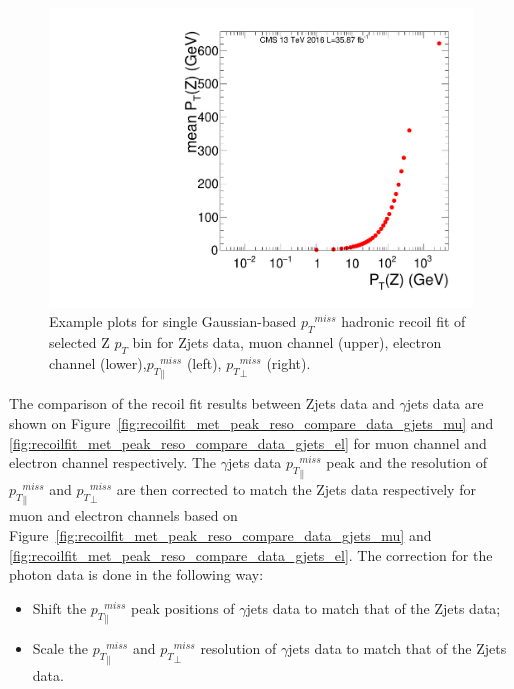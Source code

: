 \begin{figure}[htbp]
\begin{center}
\includegraphics[width=0.46\linewidth, page=56]{figures/SingleEMU_Run2016Full_03Feb2017_allcorV2_met_para_study_ZSelecLowLPt_el.pdf}
\caption{Example plots for single Gaussian-based ${p_{T}}^{miss}$ hadronic recoil fit of selected Z $p_T$ bin for Zjets data, muon channel (upper), electron channel (lower),${p_{T}}^{miss}_\parallel$ (left), ${p_{T}}^{miss}_\perp$ (right).}
\label{fig:recoilfit_example_data}
\end{center}
\end{figure}


\vspace{0.3cm}
The comparison of the recoil fit results between Zjets data and $\gamma$jets data are shown on 
Figure~\ref{fig:recoilfit_met_peak_reso_compare_data_gjets_mu}
and \ref{fig:recoilfit_met_peak_reso_compare_data_gjets_el}
for muon channel and electron channel respectively. The $\gamma$jets data ${p_{T}}^{miss}_\parallel$ peak and the resolution of ${p_{T}}^{miss}_\parallel$ and ${p_{T}}^{miss}_\perp$ are then corrected to match the Zjets data respectively for muon and electron channels based on Figure~\ref{fig:recoilfit_met_peak_reso_compare_data_gjets_mu} and \ref{fig:recoilfit_met_peak_reso_compare_data_gjets_el}. The correction for the photon data is done in the following way:
\begin{itemize}
\item Shift the ${p_{T}}^{miss}_\parallel$ peak positions of $\gamma$jets data to match that of the Zjets data;
\item Scale the ${p_{T}}^{miss}_\parallel$ and ${p_{T}}^{miss}_\perp$ resolution of $\gamma$jets data to match that of the Zjets data.
\end{itemize}

